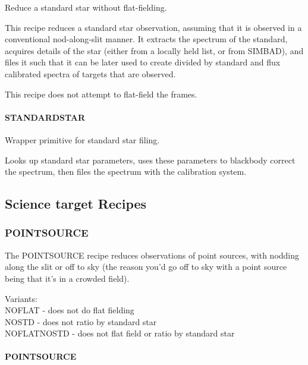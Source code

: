 \documentclass[twoside,11pt]{article}
\renewcommand{\_}{\texttt{\symbol{95}}}
\begin{document}
Reduce a standard star without flat-fielding.


\mbox{}


This recipe reduces a standard star observation, assuming that it is
observed in a conventional nod-along-slit manner. It extracts the
spectrum of the standard, acquires details of the star (either from a
locally held list, or from SIMBAD), and files it such that it can be
later used to create divided by standard and flux calibrated spectra
of targets that are observed.



This recipe does not attempt to flat-field the frames.

\paragraph{\_STANDARD\_STAR\_\label{_STANDARD_STAR_}}


Wrapper primitive for standard star filing.


\mbox{}


Looks up standard star parameters, uses these parameters to blackbody
correct the spectrum, then files the spectrum with the calibration system.


\subsection{Science target Recipes}

\subsubsection{POINT\_SOURCE}

The POINT\_SOURCE recipe reduces observations of point sources, with
nodding along the slit or off to sky (the reason you'd go off to sky
with a point source being that it's in a crowded field).


Variants: \\
\_NOFLAT - does not do flat fielding \\
\_NOSTD - does not ratio by standard star \\
\_NOFLAT\_NOSTD - does not flat field or ratio by standard star \\

\paragraph{POINT\_SOURCE\label{POINT_SOURCE}}
\end{document}
